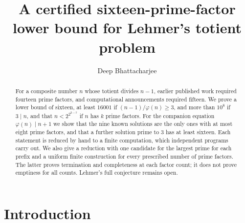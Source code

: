 \documentclass[screen,reqno]{aomart}
\title[Lehmer's totient problem]
{A certified sixteen-prime-factor lower bound for Lehmer's totient problem}
\author{Deep Bhattacharjee}
\date{}
\numberwithin{equation}{section}
\theoremstyle{plain}
\theoremstyle{definition}
\theoremstyle{remark}
\begin{document}
\begin{abstract}
For a composite number $n$ whose totient divides $n-1$, earlier
published work required fourteen prime factors, and computational
announcements required fifteen. We prove a lower bound of sixteen,
at least $16001$ if $(n-1)/\varphi(n)\ge3$, and more than $10^8$ if
$3\mid n$, and that $n<2^{2^{k-7}}$ if $n$ has $k$ prime factors. For
the companion equation $\varphi(n)\mid n+1$ we show that the nine known
solutions are the only ones with at most eight prime factors, and that
a further solution prime to $3$ has at least sixteen. Each
statement is reduced by hand to a finite computation, which independent
programs carry out. We also give a reduction with one candidate for the
largest prime for each prefix and a uniform finite construction for every prescribed number of prime factors. The latter proves termination and completeness at each factor count; it does not prove emptiness for all counts. Lehmer's full conjecture remains open.
\end{abstract}

\maketitle

\section{Introduction}\label{sec:intro}
\end{document}
